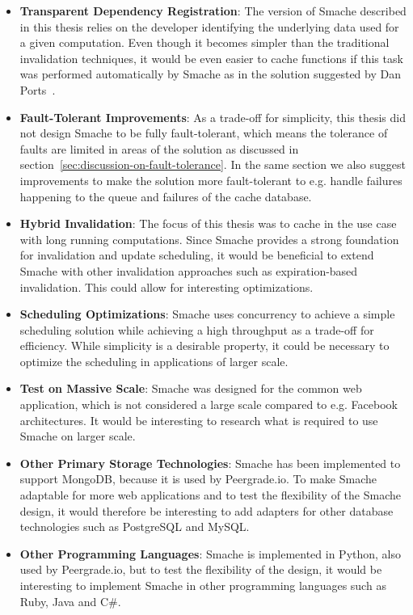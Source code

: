 \begin{itemize}
  \item \textbf{Transparent Dependency Registration}: The version of Smache described in this thesis relies on the developer identifying the underlying data used for a given computation. Even though it becomes simpler than the traditional invalidation techniques, it would be even easier to cache functions if this task was performed automatically by Smache as in the solution suggested by Dan Ports~\cite{paper:liskov}.
  \item \textbf{Fault-Tolerant Improvements}: As a trade-off for simplicity, this thesis did not design Smache to be fully fault-tolerant, which means the tolerance of faults are limited in areas of the solution as discussed in section~\ref{sec:discussion-on-fault-tolerance}. In the same section we also suggest improvements to make the solution more fault-tolerant to e.g. handle failures happening to the queue and failures of the cache database.
  \item \textbf{Hybrid Invalidation}: The focus of this thesis was to cache in the use case with long running computations. Since Smache provides a strong foundation for invalidation and update scheduling, it would be beneficial to extend Smache with other invalidation approaches such as expiration-based invalidation. This could allow for interesting optimizations.
  \item \textbf{Scheduling Optimizations}: Smache uses concurrency to achieve a simple scheduling solution while achieving a high throughput as a trade-off for efficiency. While simplicity is a desirable property, it could be necessary to optimize the scheduling in applications of larger scale.
  \item \textbf{Test on Massive Scale}: Smache was designed for the common web application, which is not considered a large scale compared to e.g. Facebook architectures. It would be interesting to research what is required to use Smache on larger scale.
  \item \textbf{Other Primary Storage Technologies}: Smache has been implemented to support MongoDB, because it is used by Peergrade.io. To make Smache adaptable for more web applications and to test the flexibility of the Smache design, it would therefore be interesting to add adapters for other database technologies such as PostgreSQL and MySQL.
  \item \textbf{Other Programming Languages}: Smache is implemented in Python, also used by Peergrade.io, but to test the flexibility of the design, it would be interesting to implement Smache in other programming languages such as Ruby, Java and C\#.
\end{itemize}




